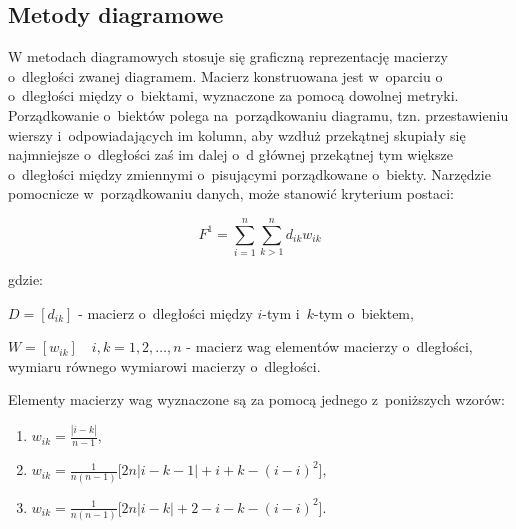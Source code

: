 \documentclass[12pt,a4paper]{report}
\begin{document}
\subsection{Metody diagramowe}


W metodach diagramowych stosuje się graficzną reprezentację macierzy o~dległości zwanej diagramem. Macierz konstruowana jest w~oparciu o~ o~dległości między o~biektami, wyznaczone za pomocą dowolnej metryki. Porządkowanie o~biektów polega na~porządkowaniu diagramu, tzn. przestawieniu wierszy i~odpowiadających im kolumn, aby wzdłuż przekątnej skupiały się najmniejsze o~dległości zaś im dalej o~d głównej przekątnej tym większe o~dległości między zmiennymi o~pisującymi porządkowane o~biekty.  %
Narzędzie pomocnicze w~porządkowaniu danych, może stanowić kryterium postaci:


$$
F^1= \sum_{i=1}^{n} \sum_{k>1}^{n} d_{ik}w_{ik}
$$

gdzie:

$D=[d_{ik}]$ - macierz o~dległości między $i$-tym i~$k$-tym o~biektem,
 
$W=[w_{ik}] \quad i,k=1, 2, \ldots, n$ - macierz wag elementów macierzy o~dległości, wymiaru równego wymiarowi macierzy o~dległości.
 

Elementy macierzy wag wyznaczone są za pomocą jednego z~poniższych wzorów:
\begin{enumerate}[label=(\alph*)]
\item $w_{ik}=\frac{| i-k |}{n-1}, \qquad$
\item $w_{ik}=\frac{1}{n(n-1)}\lbrack{2n|i-k-1|+i+k-(i-i)^2\rbrack},$
\item $w_{ik}=\frac{1}{n(n-1)}\lbrack{2n|i-k|+2-i-k-(i-i)^2\rbrack}.$
\end{enumerate}
%
% 
\end{document}
